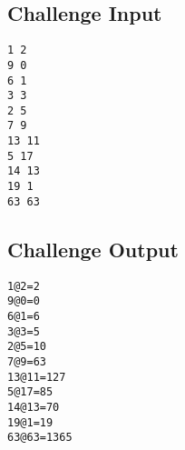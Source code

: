 \subsection*{Challenge Input}\label{challenge-input-33}

\begin{lstlisting}
1 2
9 0
6 1
3 3
2 5
7 9
13 11
5 17
14 13
19 1
63 63
\end{lstlisting}

\subsection*{Challenge Output}\label{challenge-output-27}

\begin{lstlisting}
1@2=2
9@0=0
6@1=6
3@3=5
2@5=10
7@9=63
13@11=127
5@17=85
14@13=70
19@1=19
63@63=1365
\end{lstlisting}

